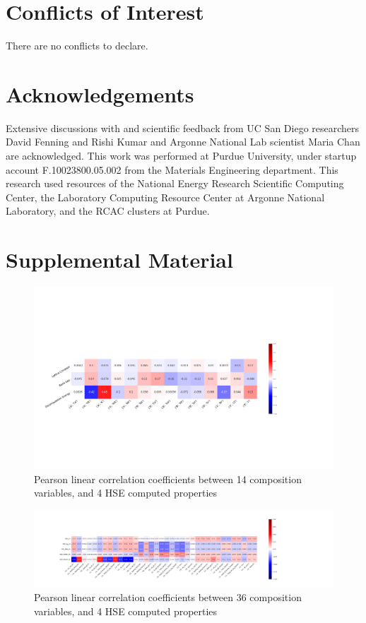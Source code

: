 \documentclass[twoside, twocolumn, 9pt, draft]{article}
\begin{document}
\section*{Conflicts of Interest}
\label{sec:orgdb135d6}
There are no conflicts to declare.

\section*{Acknowledgements}
\label{sec:orgcdc6b4e}
Extensive discussions with and scientific feedback from UC San Diego
researchers David Fenning and Rishi Kumar and Argonne National Lab
scientist Maria Chan are acknowledged. This work was performed at
Purdue University, under startup account F.10023800.05.002 from the
Materials Engineering department. This research used resources of the
National Energy Research Scientific Computing Center, the Laboratory
Computing Resource Center at Argonne National Laboratory, and the RCAC
clusters at Purdue.



\section*{Supplemental Material}
\label{sec:org4edc854}
\printglossaries

\begin{figure}
\centering
\includegraphics[width=.9\linewidth]{HSE_v_comp_pearson2.png}
\caption{\label{fig:pearson_hcomp} Pearson linear correlation coefficients between 14 composition variables, and 4 HSE computed properties}
\end{figure}

\begin{figure}
\centering
\includegraphics[width=.9\linewidth]{HSE_v_site_prop_pearson.png}
\caption{\label{fig:pearson_hsite} Pearson linear correlation coefficients between 36 composition variables, and 4 HSE computed properties}
\end{figure}
\end{document}

